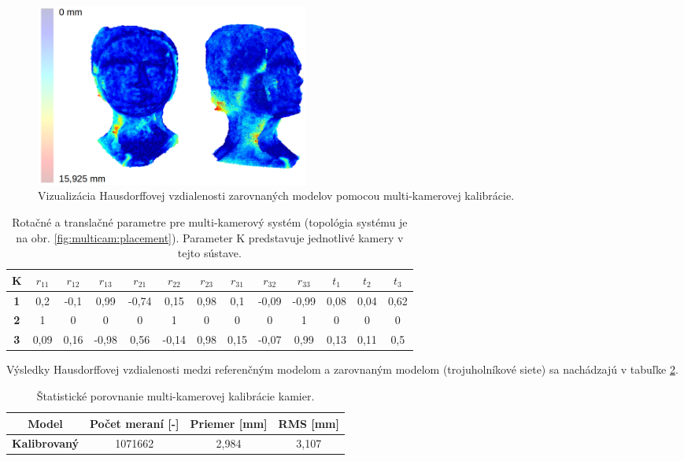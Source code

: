 \begin{figure}[h]
	\centering
	\includegraphics[height=6cm]{figures/calibration_hausdorff_multi.png}
	\caption{Vizualizácia Hausdorffovej vzdialenosti zarovnaných modelov pomocou multi-kamerovej kalibrácie.}
	\label{fig:calib:multi:haus}
\end{figure}

\begin{table}[h]
	\centering
	\caption{\label{tab:calib:multi} Rotačné a translačné parametre pre multi-kamerový systém (topológia systému je na obr. \ref{fig:multicam:placement}). Parameter K predstavuje jednotlivé kamery v tejto sústave. }
	\begin{tabular}{ccccccccccccc}
		\toprule
		\textbf{K} & \textbf{$r_{11}$} & \textbf{$r_{12}$} & \textbf{$r_{13}$} & \textbf{$r_{21}$} & \textbf{$r_{22}$} & \textbf{$r_{23}$} & \textbf{$r_{31}$} & \textbf{$r_{32}$} & \textbf{$r_{33}$} & \textbf{$t_{1}$} & \textbf{$t_{2}$} & \textbf{$t_{3}$} \\ 
		\midrule
		\textbf{1} & 0,2 & -0,1 & 0,99 & -0,74 & 0,15 & 0,98 & 0,1 & -0,09 & -0,99 & 0,08 & 0,04 & 0,62 \\
		\textbf{2} & 1 & 0 & 0 & 0 & 1 & 0 & 0 & 0 & 1 & 0 & 0 & 0 \\ 
		\textbf{3} & 0,09 & 0,16 & -0,98 & 0,56 & -0,14 & 0,98 & 0,15 & -0,07 & 0,99 & 0,13 & 0,11 & 0,5 \\
		\bottomrule
	\end{tabular}
\end{table}

Výsledky Hausdorffovej vzdialenosti medzi referenčným modelom a zarovnaným modelom (trojuholníkové siete) sa nachádzajú v tabuľke \ref{tab:calib:multi:hd}.

\begin{table}[H]
	\caption{\label{tab:calib:multi:hd} Štatistické porovnanie multi-kamerovej kalibrácie kamier. }
	\centering
	\begin{tabular}{cccc}
		\toprule
		\textbf{Model} & \textbf{Počet meraní [-]} & \textbf{Priemer [mm]} & \textbf{RMS [mm]} \\ 
		\midrule
		\textbf{Kalibrovaný} & 1071662   & 2,984   & 3,107  \\  
		\bottomrule
	\end{tabular}
\end{table}

